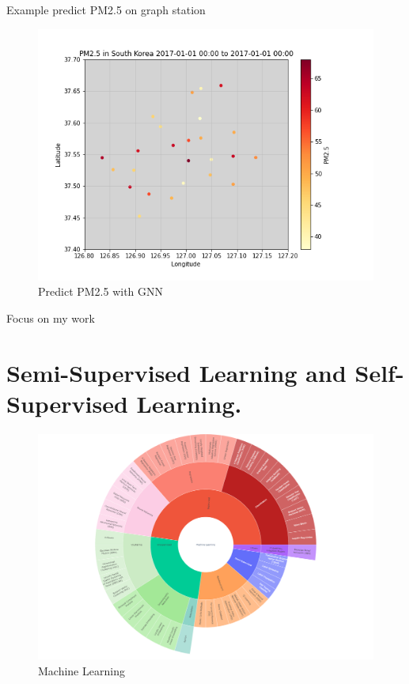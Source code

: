 \documentclass{beamer}
\begin{document}
	\begin{frame}[t]{Example predict PM2.5 on graph station}
		\begin{figure}
			\includegraphics[scale=0.4]{station_pm.png}
			\caption{Predict PM2.5 with GNN}
		\end{figure}
	\end{frame}
	\begin{frame}[t]{Focus on my work}
		\section{Semi-Supervised Learning and Self-Supervised Learning.}
		
		\begin{figure}
			\centering
			\includegraphics[scale=0.1]{newplot.png}
			\caption{Machine Learning}
		\end{figure}
	

	\end{frame}	
\end{document}
